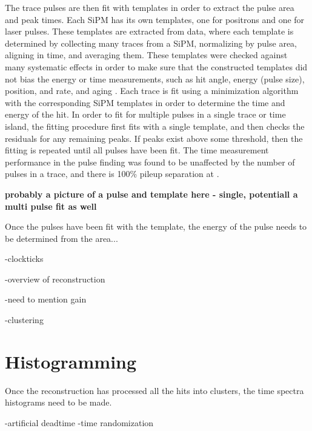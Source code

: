 The trace pulses are then fit with templates in order to extract the pulse area and peak times. Each SiPM has its own templates, one for positrons and one for laser pulses. These templates are extracted from data, where each template is determined by collecting many traces from a SiPM, normalizing by pulse area, aligning in time, and averaging them. These templates were checked against many systematic effects in order to make sure that the constructed templates did not bias the energy or time measurements, such as hit angle, energy (pulse size), position, and rate, and aging \cite{Kaspar:2016ofv,AFThesis}. Each trace is fit using a \chisq minimization algorithm with the corresponding SiPM templates in order to determine the time and energy of the hit. In order to fit for multiple pulses in a single trace or time island, the fitting procedure first fits with a single template, and then checks the residuals for any remaining peaks. If peaks exist above some threshold, then the fitting is repeated until all pulses have been fit. The time measurement performance in the pulse finding was found to be unaffected by the number of pulses in a trace, and there is 100\% pileup separation at  \cite{AFThesis}. 



\textbf{probably a picture of a pulse and template here - single, potentiall a multi pulse fit as well}


Once the pulses have been fit with the template, the energy of the pulse needs to be determined from the area...







-clockticks






-overview of reconstruction

-need to mention gain


-clustering




\section{Histogramming}
\label{sec:Histogramming}


Once the reconstruction has processed all the hits into clusters, the time spectra histograms need to be made.



-artificial deadtime
-time randomization

